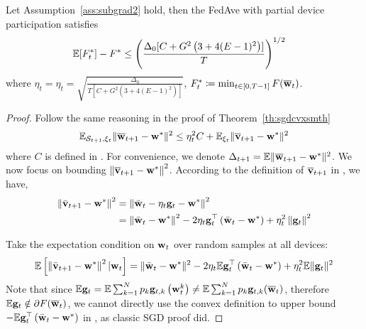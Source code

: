 \begin{theorem}
	Let Assumption~\ref{ass:subgrad2} hold, 
	then the FedAve with partial device participation satisfies
	\begin{align}
		 \mathbb{E}[F^*_t] - F^* &\leq  \left(\frac{\Delta_0[C+ G^2 \left(3 + 4(E-1)^2\right)]}{T}\right)^{1/2}
	\end{align}
	where $\eta_t = \eta_t  = \sqrt{ \frac{\Delta_0}{T[C+ G^2 \left(3 + 4(E-1)^2\right)]}}$,
	$F^*_t \coloneqq \min_{t \in [0, T-1]} F(\overline{{\mathbf{w}}}_t)$.
\end{theorem}
\begin{proof}
Follow the same reasoning in the proof of Theorem~\ref{th:sgdcvxsmth} \eq{\ref{eq:sgdcvxsmth1}}
$$\mathbb{E}_{{\mathcal{S}}_{t+1}, \xi_{t}} \|{\overline{\mathbf{w}}}_{t+1} - {\mathbf{w}}^*\|^2 \leq  \eta_t^2 C + \mathbb{E}_{\xi_t} \|\overline{{\mathbf{v}}}_{t+1} - {\mathbf{w}}^*\|^2 $$
where $C$ is defined in \eq{\ref{eq:partialsample}}. For convenience, we denote $\Delta_{t+1} = \mathbb{E} \|\overline{{\mathbf{w}}}_{t+1} - {\mathbf{w}}^*\|^2$. We now focus on bounding $\left\|{\overline{\mathbf{v}}}_{t+1}-{\mathbf{w}}^{*}\right\|^2$.
According to the definition of $\overline{{\mathbf{v}}}_{t+1}$ in \eq{\ref{eq:vbar}}, we have,
$$\begin{aligned}\left\|\bar{{\mathbf{v}}}_{t+1}-{\mathbf{w}}^{*}\right\|^2 &=\left\|\bar{{\mathbf{w}}}_{t}-\eta_{t} {\mathbf{g}}_{t}-{\mathbf{w}}^{*}\right\|^2 \\ &=\left\|\bar{{\mathbf{w}}}_{t}-{\mathbf{w}}^{*}\right\|^{2}-2 \eta_{t} {\mathbf{g}}_{t}^{\top}\left(\bar{{\mathbf{w}}}_{t}-{\mathbf{w}}^{*}\right)+\eta_{t}^{2}\left\|{\mathbf{g}}_{t}\right\|^{2} \end{aligned}$$

Take the expectation condition on ${\mathbf{w}}_t$ over random samples at all devices:
\begin{align}
\mathbb{E}\left[\left\|\bar{{\mathbf{v}}}_{t+1}-{\mathbf{w}}^{*}\right\|^2| {\mathbf{w}}_{t}\right]=\|\bar{{\mathbf{w}}}_{t}-{\mathbf{w}}^{*}\|^{2}-2 \eta_{t} \mathbb{E} {\mathbf{g}}_{t}^{\top}\left(\bar{{\mathbf{w}}}_{t}-{\mathbf{w}}^{*}\right)+\eta_{t}^{2} \mathbb{E}\| {\mathbf{g}}_{t} \|^{2}	
\label{eq:expand}
\end{align}
Note that since $\mathbb{E} {\mathbf{g}}_t = \mathbb{E} \sum_{k=1}^{N} p_{k} {\mathbf{g}}_{t, k}\left({\mathbf{w}}_{t}^{k}\right) \neq \mathbb{E} \sum_{k=1}^Np_k {\mathbf{g}}_{t,k}(\overline{{\mathbf{w}}}_t)$, therefore $\mathbb{E} {\mathbf{g}}_t \notin \partial F(\overline{{\mathbf{w}}}_t)$, we cannot directly use the convex definition to
upper bound $- \mathbb{E} {\mathbf{g}}_{t}^{\top}\left(\bar{{\mathbf{w}}}_{t}-{\mathbf{w}}^{*}\right)$ in \eq{\ref{eq:expand}}, as classic SGD proof did. 


\end{proof}
